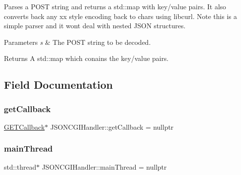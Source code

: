 Parses a P\+O\+ST string and returns a std\+::map with key/value pairs. It also converts back any xx style encoding back to chars using libcurl. Note this is a simple parser and it won\textquotesingle{}t deal with nested J\+S\+ON structures. 
\begin{DoxyParams}{Parameters}
{\em s} & The P\+O\+ST string to be decoded. \\
\hline
\end{DoxyParams}
\begin{DoxyReturn}{Returns}
A std\+::map which conains the key/value pairs. 
\end{DoxyReturn}


\subsection{Field Documentation}
\mbox{\label{classJSONCGIHandler_a7c8b4a44e15ac57fe93b382e86899fa7}} 
\subsubsection{\texorpdfstring{get\+Callback}{getCallback}}
{\footnotesize\ttfamily \hyperlink{classJSONCGIHandler_1_1GETCallback}{G\+E\+T\+Callback}$\ast$ J\+S\+O\+N\+C\+G\+I\+Handler\+::get\+Callback = nullptr\hspace{0.3cm}{\ttfamily [private]}}

\mbox{\label{classJSONCGIHandler_aca513f708ae4dc76ba70196ff25da695}} 
\subsubsection{\texorpdfstring{main\+Thread}{mainThread}}
{\footnotesize\ttfamily std\+::thread$\ast$ J\+S\+O\+N\+C\+G\+I\+Handler\+::main\+Thread = nullptr\hspace{0.3cm}{\ttfamily [private]}}

\mbox{\label{classJSONCGIHandler_a09ee0f555db808d07c9ee9a575780553}} 
